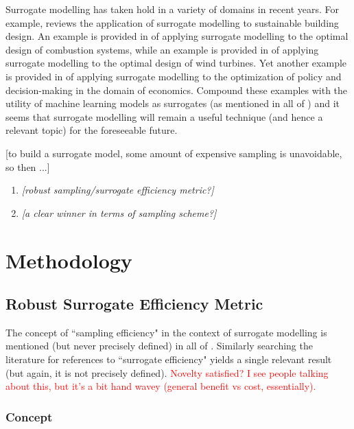 \documentclass[conference]{IEEEtran}
\begin{document}
	Surrogate modelling has taken hold in a variety of domains in recent years. For example, \cite{Westermann_2019} reviews the application of surrogate modelling to sustainable building design. An example is provided in \cite{Liu_2023} of applying surrogate modelling to the optimal design of combustion systems, while an example is provided in \cite{Haghi_2022} of applying surrogate modelling to the optimal design of wind turbines. Yet another example is provided in \cite{vanderHoog_2018} of applying surrogate modelling to the optimization of policy and decision-making in the domain of economics. Compound these examples with the utility of machine learning models as surrogates (as mentioned in all of \cite{Westermann_2019, Liu_2023, vanderHoog_2018}) and it seems that surrogate modelling will remain a useful technique (and hence a relevant topic) for the foreseeable future.
	
	[to build a surrogate model, some amount of expensive sampling is unavoidable, so then ...]
	
\begin{enumerate}
	\item \textit{[robust sampling/surrogate efficiency metric?]}
	\item \textit{[a clear winner in terms of sampling scheme?]}
\end{enumerate}

\section{Methodology}

\subsection{Robust Surrogate Efficiency Metric}

The concept of ``sampling efficiency" in the context of surrogate modelling is mentioned (but never precisely defined) in all of \cite{Gong_2017, Westermann_2019_2, Yin_2011}. Similarly searching the literature for references to ``surrogate efficiency" yields a single relevant result \cite{Casper_2016} (but again, it is not precisely defined). \textcolor{red}{Novelty satisfied? I see people talking about this, but it's a bit hand wavey (general benefit vs cost, essentially).}

\subsubsection{Concept}
\end{document}
